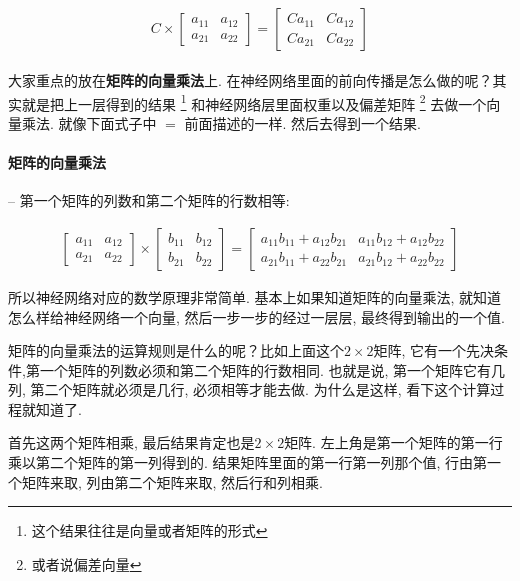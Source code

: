 \begin{align*}
  \begin{split} C \times \begin{bmatrix} a_{11} & a_{12} \\ a_{21} & a_{22} \end{bmatrix}= \begin{bmatrix} Ca_{11} & Ca_{12} \\ Ca_{21} & Ca_{22} \end{bmatrix} \end{split}
\end{align*}

大家重点的放在\textbf{矩阵的向量乘法}上. 在神经网络里面的前向传播是怎么做的呢？其实就是把上一层得到的结果 \footnote{这个结果往往是向量或者矩阵的形式} 和神经网络层里面权重以及偏差矩阵 \footnote{或者说偏差向量} 去做一个向量乘法. 就像下面式子中 $ = $ 前面描述的一样. 然后去得到一个结果. 

\paragraph{矩阵的向量乘法} -- 第一个矩阵的列数和第二个矩阵的行数相等:

\begin{align*}
  \begin{bmatrix} a_{11} & a_{12} \\ a_{21} & a_{22} \end{bmatrix} \times \begin{bmatrix} b_{11} & b_{12} \\ b_{21} & b_{22} \end{bmatrix}=\begin{bmatrix} a_{11}b_{11} + a_{12}b_{21} & a_{11}b_{12} + a_{12}b_{22} \\ a_{21}b_{11} + a_{22}b_{21} & a_{21}b_{12} + a_{22}b_{22} \end{bmatrix}
\end{align*}

所以神经网络对应的数学原理非常简单. 基本上如果知道矩阵的向量乘法, 就知道怎么样给神经网络一个向量, 然后一步一步的经过一层层, 最终得到输出的一个值. 

矩阵的向量乘法的运算规则是什么的呢？比如上面这个$2\times2$矩阵, 它有一个先决条件,第一个矩阵的列数必须和第二个矩阵的行数相同. 也就是说, 第一个矩阵它有几列, 第二个矩阵就必须是几行, 必须相等才能去做. 为什么是这样, 看下这个计算过程就知道了. 

首先这两个矩阵相乘, 最后结果肯定也是$2\times2$矩阵. 左上角是第一个矩阵的第一行乘以第二个矩阵的第一列得到的. 结果矩阵里面的第一行第一列那个值, 行由第一个矩阵来取, 列由第二个矩阵来取, 然后行和列相乘. 

